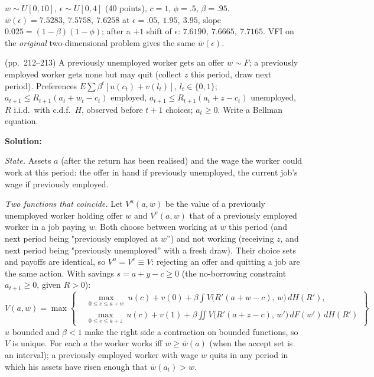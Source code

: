 \documentclass[12pt, letterpaper]{article}
\newcommand{\wb}{\bar w}
\begin{document}
\begin{tcolorbox}[evenbox,title={Exercise 6.12 \quad Search and Financial Income}]
\begin{tcolorbox}[databox]
$w\sim U[0,10]$, $\epsilon\sim U[0,4]$ (40 points), $c=1$, $\phi=.5$, $\beta=.95$. $\wb(\epsilon)=7.5283,\ 7.5758,\ 7.6258$
at $\epsilon=.05,\ 1.95,\ 3.95$, slope $0.025=(1-\beta)(1-\phi)$; after a $+1$ shift of $\epsilon$:
$7.6190,\ 7.6665,\ 7.7165$. VFI on the \emph{original} two-dimensional problem gives the same $\wb(\epsilon)$.
\end{tcolorbox}
\end{tcolorbox}

\begin{tcolorbox}[oddbox,title={Exercise 6.13 \quad Search and Asset Accumulation}]
\begin{tcolorbox}[questionbox]
(pp.~212--213) A previously unemployed worker gets an offer $w\sim F$; a previously employed worker gets
none but may quit (collect $z$ this period, draw next period). Preferences $E\sum\beta^t[u(c_t)+v(l_t)]$,
$l_t\in\{0,1\}$; $a_{t+1}\le R_{t+1}(a_t+w_t-c_t)$ employed, $a_{t+1}\le R_{t+1}(a_t+z-c_t)$ unemployed,
$R$ i.i.d.\ with c.d.f.\ $H$, observed before $t+1$ choices; $a_t\ge0$. Write a Bellman equation.
\end{tcolorbox}

\textbf{Solution:}

\emph{State.} Assets $a$ (after the return has been realised) and the wage the worker could work at this
period: the offer in hand if previously unemployed, the current job's wage if previously employed.

\emph{Two functions that coincide.} Let $V^u(a,w)$ be the value of a previously unemployed worker holding
offer $w$ and $V^e(a,w)$ that of a previously employed worker in a job paying $w$. Both choose between
working at $w$ this period (and next period being "previously employed at $w$'') and not working
(receiving $z$, and next period being "previously unemployed'' with a fresh draw). Their choice sets and
payoffs are identical, so $V^u=V^e\equiv V$: rejecting an offer and quitting a job are the same action.
With savings $s=a+y-c\ge0$ (the no-borrowing constraint $a_{t+1}\ge0$, given $R>0$):
\[
\boxed{
V(a,w)=\max\left\{
\begin{aligned}
&\max_{0\le c\le a+w}\ u(c)+v(0)+\beta\int V\big(R'(a+w-c),\,w\big)\,dH(R'),\\
&\max_{0\le c\le a+z}\ u(c)+v(1)+\beta\iint V\big(R'(a+z-c),\,w'\big)\,dF(w')\,dH(R')
\end{aligned}\right\}}
\]
$u$ bounded and $\beta<1$ make the right side a contraction on bounded functions, so $V$ is unique.
For each $a$ the worker works iff $w\ge\wb(a)$ (when the accept set is an interval); a previously
employed worker with wage $w$ quits in any period in which his assets have risen enough that
$\wb(a_t)>w$.


\end{tcolorbox}
\end{document}
